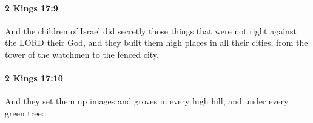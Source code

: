		\paragraph{2 Kings 17:9} %
			\label{2KINGS-17-9}

			And the children of Israel did secretly those things that were not right against the LORD their God, and they built them high places in all their cities, from the tower of the watchmen to the fenced city.


		\paragraph{2 Kings 17:10} %
			\label{2KINGS-17-10}

			And they set them up images and groves in every high hill, and under every green tree:


